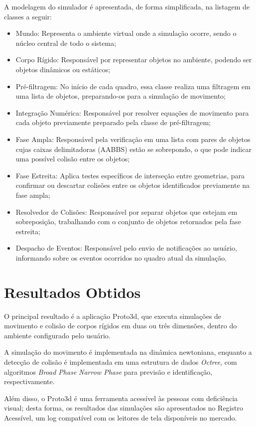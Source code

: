 \documentclass[12pt]{article}
\begin{document}
A modelagem do simulador é apresentada, de forma simplificada, na listagem de classes a seguir:

\begin{itemize}
\item Mundo: Representa o ambiente virtual onde a simulação ocorre, sendo o núcleo central de todo o sistema;
\item Corpo Rígido: Responsável por representar objetos no ambiente, podendo ser objetos dinâmicos ou estáticos;
\item Pré-filtragem: No início de cada quadro, essa classe realiza uma filtragem em uma lista de objetos, preparando-os para a simulação de movimento;
\item Integração Numérica: Responsável por resolver equações de movimento para cada objeto previamente preparado pela classe de pré-filtragem;
\item Fase Ampla: Responsável pela verificação em uma lista com pares de objetos cujas caixas delimitadoras (AABBS) estão se sobrepondo, o que pode indicar uma possível colisão entre os objetos;
\item Fase Estreita: Aplica testes específicos de interseção entre geometrias, para confirmar ou descartar colisões entre os objetos identificados previamente na fase ampla;
\item Resolvedor de Colisões: Responsável por separar objetos que estejam em sobreposição, trabalhando com o conjunto de objetos retornados pela fase estreita;
\item Despacho de Eventos: Responsável pelo envio de notificações ao usuário, informando sobre os eventos ocorridos no quadro atual da simulação.
\end{itemize}

\section{Resultados Obtidos}
O principal resultado é a aplicação Proto3d, que executa simulações de movimento e colisão de corpos rígidos em duas ou três dimensões, dentro do ambiente configurado pelo usuário. 

A simulação do movimento é implementada na dinâmica newtoniana, enquanto a detecção de colisão é implementada em uma estrutura de dados \emph{Octree}, com algoritmos \emph{Broad Phase} \emph{Narrow Phase} para previsão e identificação, respectivamente.

Além disso, o Proto3d é uma ferramenta acessível às pessoas com deficiência visual; desta forma, os resultados das simulações são apresentados no Registro Acessível, um log compatível com os leitores de tela disponíveis no mercado.
\end{document}
